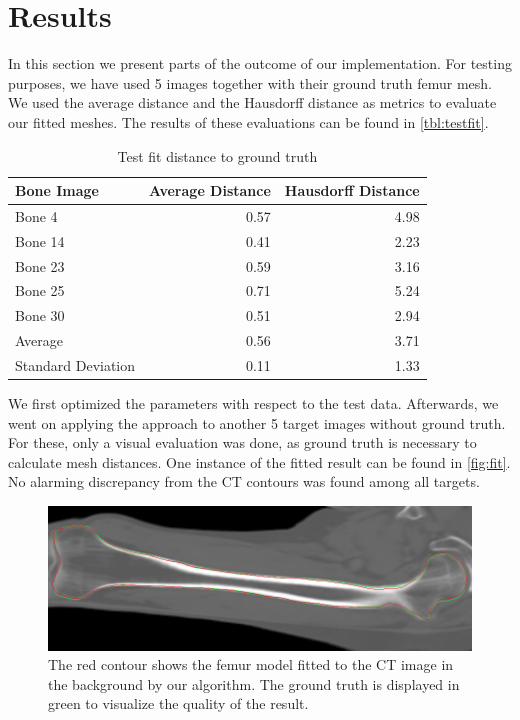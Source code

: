 \section{Results}
\label{sec:results}

In this section we present parts of the outcome of our implementation.
For testing purposes, we have used 5 images together with their ground truth femur mesh.
We used the average distance and the Hausdorff distance as metrics to evaluate our fitted meshes.
The results of these evaluations can be found in \autoref{tbl:testfit}.

\begin{table}
  \centering
  \caption{Test fit distance to ground truth}
  \label{tbl:testfit}
  \begin{tabular}{lrr}
    \toprule
      \textbf{Bone Image} &
      Average Distance &
       Hausdorff Distance \\
    \midrule
      Bone 4 & 0.57 & 4.98 \\
      Bone 14 & 0.41 & 2.23 \\
      Bone 23 & 0.59 & 3.16 \\
      Bone 25 & 0.71 & 5.24 \\
      Bone 30 & 0.51 & 2.94 \\
    \midrule
      Average & 0.56 & 3.71 \\
      Standard Deviation & 0.11 & 1.33 \\
    \bottomrule
  \end{tabular}
\end{table}

We first optimized the parameters with respect to the test data.
Afterwards, we went on applying the approach to another 5 target images without ground truth.
For these, only a visual evaluation was done, as ground truth is necessary to calculate mesh distances.
One instance of the fitted result can be found in \autoref{fig:fit}.
No alarming discrepancy from the CT contours was found among all targets.

\begin{figure}
  \centering
  \includegraphics[width=\textwidth]{./Figures/mcmc_fit}
  \caption{
    The red contour shows the femur model fitted to the CT image in the background by our algorithm. 
    The ground truth is displayed in green to visualize the quality of the result.
  }
  \label{fig:fit}
\end{figure}
